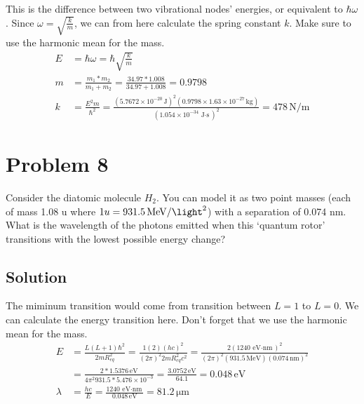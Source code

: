 \documentclass[12pt]{report}
\newcommand{\E}[1]{\times 10^{#1}}
\begin{document}
        This is the difference between two vibrational nodes' energies, or equivalent to $\hbar\omega$.
        Since $\omega = \sqrt{\frac{k}{m}}$, we can from here calculate the spring constant $k$.
        Make sure to use the harmonic mean for the mass.
        \begin{align*}
            E   &=  \hbar\omega = \hbar\sqrt{\frac{k}{m}}\\
            m   &=  \frac{m_1 * m_2}{m_1 + m_2}
                =   \frac{34.97 * 1.008}{34.97 + 1.008}
                =   0.9798\\
            k   &=  \frac{E^2 m}{\hbar^2}
                =   \frac{(5.7672\E{-20}\,\unit{\joule})^2(0.9798 \times 1.63\E{-27}\,\unit{\kilo\gram})}{(1.054\E{-34}\,\unit{\joule\cdot\second})^2}
                =   \boxed{478\,\unit{\newton/\meter}}
        \end{align*}
    \pagebreak

\section*{Problem 8}
    Consider the diatomic molecule $H_2$. 
    You can model it as two point masses (each of mass 1.08 u where $1u = 931.5\,\unit{\mega\eV/\light^2}$) with a separation of 0.074 nm. 
    What is the wavelength of the photons emitted when this `quantum rotor' transitions with the lowest possible energy change? 

    \subsection*{Solution}
        The miminum transition would come from transition between $L = 1$ to $L = 0$.
        We can calculate the energy transition here.
        Don't forget that we use the harmonic mean for the mass.
        \begin{align*}
            E   &=  \frac{L(L+1)\hbar^2}{2mR_{eq}^2}
                =   \frac{1(2)(hc)^2}{(2\pi)^2 2mR_{eq}^2 c^2}
                =   \frac{2(1240\,\unit{\eV\cdot\nano\meter})^2}{(2\pi)^2 (931.5\,\unit{\mega\eV}) (0.074\,\unit{\nano\meter})^2}\\
                &=  \frac{2*1.5376\,\unit{\eV}}{4\pi^2 931.5 * 5.476\E{-3}}
                =   \frac{3.0752\,\unit{\eV}}{64.1}
                =   0.048\,\unit{\eV}\\
            \lambda &=  \frac{hc}{E}
                =   \frac{1240\,\unit{\eV\cdot\nano\meter}}{0.048\,\unit{\eV}}
                =   \boxed{81.2\,\unit{\micro\meter}}
        \end{align*}
    \pagebreak
\end{document}
